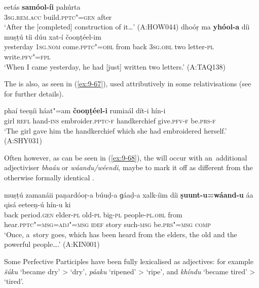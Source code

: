 \ea
\label{ex:9-65}
\gll eetás \textbf{samóol-íi} pahúrta \\
\textsc{3sg.rem.acc} build.\textsc{pptc"=gen} after \\
\glt `After the [completed] construction of it{\ldots}' (A:HOW044) 
\ex
\label{ex:9-66}
\gll dhoóṛ ma \textbf{yhóol-a} díi muṣṭú tíi dúu xat-í čooṇṭéel-im\\
yesterday 1\textsc{sg.nom} come.\textsc{pptc"=obl} from back \textsc{3sg.obl} two letter-\textsc{pl} write.\textsc{pfv"=fpl}\\
\glt `When I came yesterday, he had [just] written two letters.' (A:TAQ138)
\z

The  is also, as seen in (\ref{ex:9-67}), used attributively in some relativisations (see  for further details).

\begin{exe}
\ex
\label{ex:9-67}
\gll phaí teeṇíi háat"=am \textbf{čooṇṭéel-i} rumiaál dít-i hín-i \\
girl \textsc{refl} hand-\textsc{ins} embroider.\textsc{pptc-f} handkerchief give.\textsc{pfv-f} be.\textsc{prs-f} \\
\glt `The girl gave him the handkerchief which she had embroidered herself.' (A:SHY031)
\end{exe}

Often however, as can be seen in (\ref{ex:9-68}), the  will occur with an~additional adjectiviser \textit{bhaáu} or \textit{wáandu/wéendi}, maybe to mark it off as different from the otherwise formally identical .

\ea
\label{ex:9-68}
\gll muṣṭú zamanáii paṇardóoṛ-a búuḍ-a ɡáaḍ-a xalk-íim díi \textbf{ṣuunt-u=wáand-u} áa qisá eeteeṇ-ú hín-u ki\\
back period.\textsc{gen} elder-\textsc{pl} old-\textsc{pl} big-\textsc{pl}  people-\textsc{pl.obl} from hear.\textsc{pptc"=msg=adj"=msg} \textsc{idef} story such-\textsc{msg} be.\textsc{prs"=msg} \textsc{comp} \\
\glt `Once, a~story goes, which has been heard from the elders, the old and the powerful people{\ldots}.'
(A:KIN001)
\z

Some Perfective Participles have been fully lexicalised as adjectives: for example \textit{šúku} `became dry' {\textgreater} `dry', \textit{páaku} `ripened' {\textgreater} `ripe', and \textit{khíndu} `became tired' {\textgreater} `tired'.


